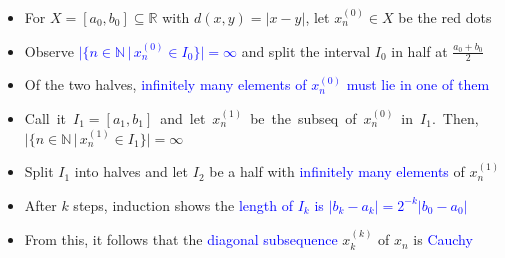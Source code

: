 \documentclass[10pt,english,aspectratio=169]{beamer}
\begin{document}
\begin{frame}
\vspace{-3mm}

\begin{itemize}
\setlength{\itemsep}{1.25mm}
\item<1-> For $X = [a_0,b_0] \subseteq \mathbb{R}$ with $d(x,y) = |x-y|$, let $x_n^{(0)} \in X$ be the red dots$\!\!\!\!\!\!\!\!\!$
\item<2-> Observe \textcolor{blue}{$|\{n\in \mathbb{N} \, |\, x_{n}^{(0)} \in I_0 \} | = \infty$} and split the interval $I_0$ in half at $\frac{a_0+b_0}{2}$
\item<3-> Of the two halves, \textcolor{blue}{infinitely many elements of $x_n^{(0)}$ must lie in one of them$\!\!\!\!\!\!$}
\item<4-> \mbox{Call it $I_1 = [a_1,b_1]$ and let $x_{n}^{(1)}$ be the subseq of $x_n^{(0)}$ in $I_1$. Then, $|\{n\in \mathbb{N} \, |\, x^{(1)}_{n} \in I_1 \} | = \infty\!\!\!\!\!\!\!\!\!\!\!\!\!\!\!\!\!\!\!\!\!\!\!\!\!\!\!\!\!\!\!\!\!\!\!\!\!\!\!\!\!\!\!\!\!\!\!\!\!\!\!\!$}
\item<5-> Split $I_1$ into halves and let $I_2$ be a half with \textcolor{blue}{infinitely many elements} of $x_n^{(1)} \!\!\!\!\!\!\!\!\!\!\!\!\!\!\!\!\!\!\!\!\!\!\!\!\!\!\!\!\!\!\!\!\!\!\!\!\!\!\!\!\!\!\!\!\!\!\!\!\!\!\!\!\!$
\item<6-> After $k$ steps, induction shows the \textcolor{blue}{length of $I_k$ is $|b_k-a_k| = 2^{-k}| b_0-a_0 |$}
\item<7-> From this, it follows that the \textcolor{blue}{diagonal subsequence} $x^{(k)}_k$ of $x_n$ is \textcolor{blue}{Cauchy}
\end{itemize}


\end{frame}
\end{document}
